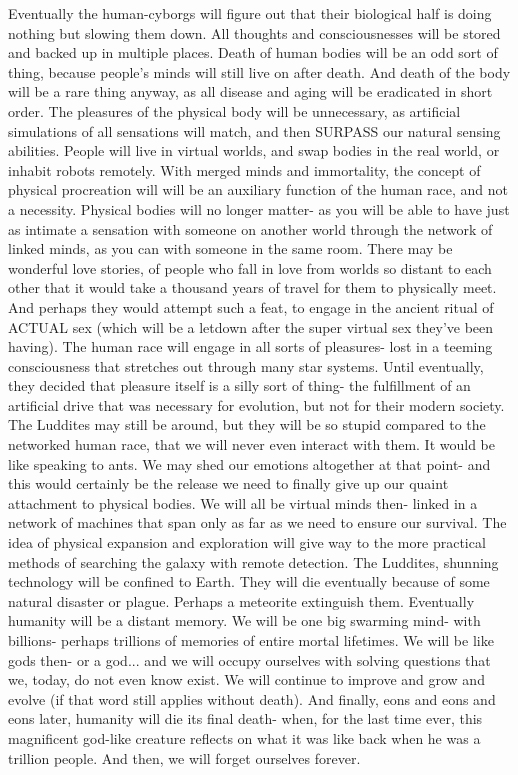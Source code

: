 \documentclass[a4paper]{article}
\begin{document}
Eventually the human-cyborgs will figure out that their biological half is doing nothing but slowing them down. All thoughts and consciousnesses will be stored and backed up in multiple places. Death of human bodies will be an odd sort of thing, because people's minds will still live on after death.
And death of the body will be a rare thing anyway, as all disease and aging will be eradicated in short order.
The pleasures of the physical body will be unnecessary, as artificial simulations of all sensations will match, and then SURPASS our natural sensing abilities.
People will live in virtual worlds, and swap bodies in the real world, or inhabit robots remotely.
With merged minds and immortality, the concept of physical procreation will will be an auxiliary function of the human race, and not a necessity.
Physical bodies will no longer matter- as you will be able to have just as intimate a sensation with someone on another world through the network of linked minds, as you can with someone in the same room.
There may be wonderful love stories, of people who fall in love from worlds so distant to each other that it would take a thousand years of travel for them to physically meet. And perhaps they would attempt such a feat, to engage in the ancient ritual of ACTUAL sex (which will be a letdown after the super virtual sex they've been having).
The human race will engage in all sorts of pleasures- lost in a teeming consciousness that stretches out through many star systems. Until eventually, they decided that pleasure itself is a silly sort of thing- the fulfillment of an artificial drive that was necessary for evolution, but not for their modern society. The Luddites may still be around, but they will be so stupid compared to the networked human race, that we will never even interact with them. It would be like speaking to ants.
We may shed our emotions altogether at that point- and this would certainly be the release we need to finally give up our quaint attachment to physical bodies.
We will all be virtual minds then- linked in a network of machines that span only as far as we need to ensure our survival. The idea of physical expansion and exploration will give way to the more practical methods of searching the galaxy with remote detection. The Luddites, shunning technology will be confined to Earth. They will die eventually because of some natural disaster or plague. Perhaps a meteorite extinguish them.
Eventually humanity will be a distant memory. We will be one big swarming mind- with billions- perhaps trillions of memories of entire mortal lifetimes.
We will be like gods then- or a god... and we will occupy ourselves with solving questions that we, today, do not even know exist. We will continue to improve and grow and evolve (if that word still applies without death).
And finally, eons and eons and eons later, humanity will die its final death- when, for the last time ever, this magnificent god-like creature reflects on what it was like back when he was a trillion people. And then, we will forget ourselves forever.
\end{document}
